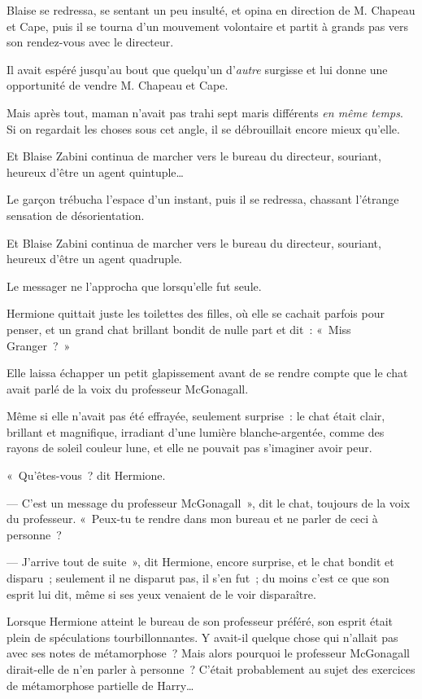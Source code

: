 Blaise se redressa, se sentant un peu insulté, et opina en direction de M. Chapeau et Cape, puis il se tourna d'un mouvement volontaire et partit à grands pas vers son rendez-vous avec le directeur.

Il avait espéré jusqu'au bout que quelqu'un d'\emph{autre} surgisse et lui donne une opportunité de vendre M. Chapeau et Cape.

Mais après tout, maman n'avait pas trahi sept maris différents \emph{en même temps}. Si on regardait les choses sous cet angle, il se débrouillait encore mieux qu'elle.

Et Blaise Zabini continua de marcher vers le bureau du directeur, souriant, heureux d'être un agent quintuple…

Le garçon trébucha l'espace d'un instant, puis il se redressa, chassant l'étrange sensation de désorientation.

Et Blaise Zabini continua de marcher vers le bureau du directeur, souriant, heureux d'être un agent quadruple.


Le messager ne l'approcha que lorsqu'elle fut seule.

Hermione quittait juste les toilettes des filles, où elle se cachait parfois pour penser, et un grand chat brillant bondit de nulle part et dit~: «~Miss Granger~?~»

Elle laissa échapper un petit glapissement avant de se rendre compte que le chat avait parlé de la voix du professeur McGonagall.

Même si elle n'avait pas été effrayée, seulement surprise~: le chat était clair, brillant et magnifique, irradiant d'une lumière blanche-argentée, comme des rayons de soleil couleur lune, et elle ne pouvait pas s'imaginer avoir peur.

«~Qu'êtes-vous~? dit Hermione.

--- C'est un message du professeur McGonagall~», dit le chat, toujours de la voix du professeur. «~Peux-tu te rendre dans mon bureau et ne parler de ceci à personne~?

--- J'arrive tout de suite~», dit Hermione, encore surprise, et le chat bondit et disparu~; seulement il ne disparut pas, il s'en fut~; du moins c'est ce que son esprit lui dit, même si ses yeux venaient de le voir disparaître.

Lorsque Hermione atteint le bureau de son professeur préféré, son esprit était plein de spéculations tourbillonnantes. Y avait-il quelque chose qui n'allait pas avec ses notes de métamorphose~? Mais alors pourquoi le professeur McGonagall dirait-elle de n'en parler à personne~? C'était probablement au sujet des exercices de métamorphose partielle de Harry…

